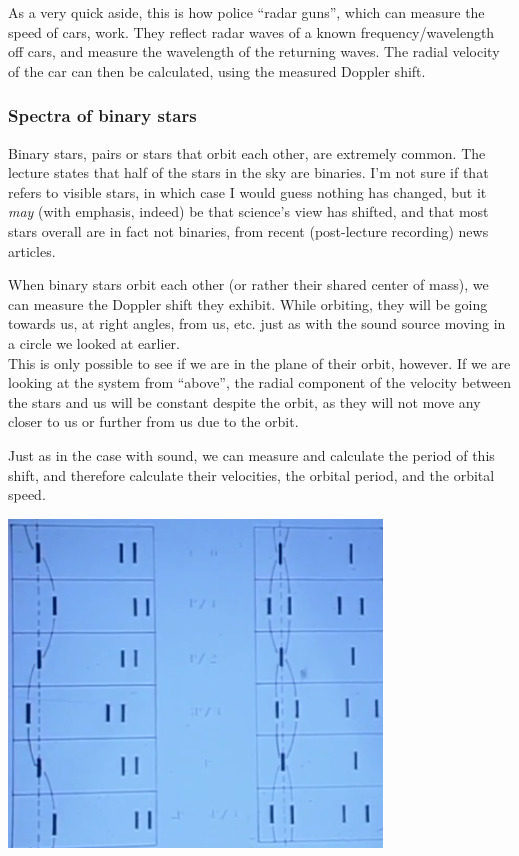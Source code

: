 \documentclass[8.01x]{subfiles}
\begin{document}
As a very quick aside, this is how police ``radar guns'', which can measure the speed of cars, work. They reflect radar waves of a known frequency/wavelength off cars, and measure the wavelength of the returning waves. The radial velocity of the car can then be calculated, using the measured Doppler shift.

\subsubsection{Spectra of binary stars}

Binary stars, pairs or stars that orbit each other, are extremely common. The lecture states that half of the stars in the sky are binaries. I'm not sure if that refers to visible stars, in which case I would guess nothing has changed, but it \emph{may} (with emphasis, indeed) be that science's view has shifted, and that most stars overall are in fact not binaries, from recent (post-lecture recording) news articles.

When binary stars orbit each other (or rather their shared center of mass), we can measure the Doppler shift they exhibit. While orbiting, they will be going towards us, at right angles, from us, etc. just as with the sound source moving in a circle we looked at earlier.\\
This is only possible to see if we are in the plane of their orbit, however. If we are looking at the system from ``above'', the radial component of the velocity between the stars and us will be constant despite the orbit, as they will not move any closer to us or further from us due to the orbit.

Just as in the case with sound, we can measure and calculate the period of this shift, and therefore calculate their velocities, the orbital period, and the orbital speed.

\begin{center}
\includegraphics[scale=0.75]{Graphics/lec23_binary_spectrum}
\end{center}
\end{document}
